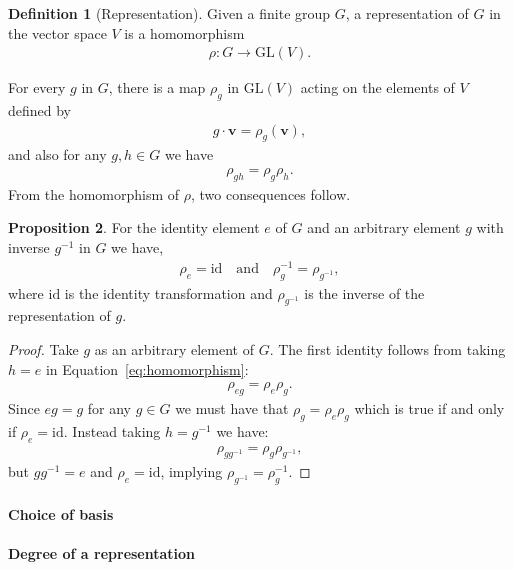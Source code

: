 \documentclass[12pt, a4paper, twoside]{article}
\theoremstyle{definition}
\newtheorem{definition}{Definition}[section]
\newtheorem{proposition}[definition]{Proposition}
\theoremstyle{remark}
\numberwithin{equation}{section}
\newcommand{\1}{\mathbf{1}}
\newcommand{\0}{\mathbf{0}}
\newcommand{\GL}{\text{GL}}
\newcommand{\id}{\text{id}}
\newcommand{\vvec}{\mathbf{v}}
\begin{document}
	\begin{definition}[Representation]\cite{Serre}
		Given a finite group $G$, a representation of $G$ in the vector space $V$ is a homomorphism
		\begin{align*}
			\rho: G \rightarrow \GL(V).
		\end{align*}
	\end{definition}
	For every $g$ in $G$, there is a map $\rho_g$ in $\GL(V)$ acting on the elements of $V$ defined by \begin{align*}
		g \cdot \vvec = \rho_g (\vvec), 
	\end{align*}
	and also for any $g,h \in G$ we have
	\begin{align}\label{eq:homomorphism}
		\rho_{gh} = \rho_g \rho_h.
	\end{align}
	From the homomorphism of $\rho$, two consequences follow.
	\begin{proposition}
		For the identity element $e$ of $G$ and an arbitrary element $g$ with inverse $g^{-1}$ in $G$ we have,
		\begin{align*}
			\rho_e = \id \quad \text{and} \quad \rho_g^{-1} = \rho_{g^{-1}},
		\end{align*}
		where $\id$ is the identity transformation and $\rho_{g^{-1}}$ is the inverse of the representation of $g$.
	\end{proposition}
	\begin{proof}
		Take $g$ as an arbitrary element of $G$. The first identity follows from taking $h=e$ in Equation~\ref{eq:homomorphism}:
		\begin{align}
			\rho_{eg} = \rho_e \rho_g.
		\end{align}
		Since $eg=g$ for any $g\in G$ we must have that $\rho_g = \rho_e\rho_g$ which is true if and only if $\rho_e = \id$. Instead taking $h=g^{-1}$ we have:
		\begin{align}
			\rho_{gg^{-1}} = \rho_g \rho_{g^{-1}},
		\end{align}
		but $gg^{-1} = e$ and $\rho_e = \id$, implying $\rho_{g^{-1}} = \rho_g^{-1}$.
	\end{proof}
	
\paragraph{Choice of basis}
\paragraph{Degree of a representation}
\end{document}
